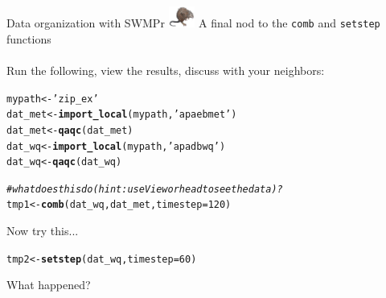 \documentclass[xcolor=dvipsnames,serif]{beamer}\usepackage[]{graphicx}\usepackage[]{color}
\makeatletter
\newcommand{\hlnum}[1]{\textcolor[rgb]{0.686,0.059,0.569}{#1}}%
\newcommand{\hlstr}[1]{\textcolor[rgb]{0.192,0.494,0.8}{#1}}%
\newcommand{\hlcom}[1]{\textcolor[rgb]{0.678,0.584,0.686}{\textit{#1}}}%
\newcommand{\hlstd}[1]{\textcolor[rgb]{0.345,0.345,0.345}{#1}}%
\newcommand{\hlkwb}[1]{\textcolor[rgb]{0.69,0.353,0.396}{#1}}%
\newcommand{\hlkwc}[1]{\textcolor[rgb]{0.333,0.667,0.333}{#1}}%
\newcommand{\hlkwd}[1]{\textcolor[rgb]{0.737,0.353,0.396}{\textbf{#1}}}%
\newenvironment{kframe}{%
 \def\at@end@of@kframe{}%
 \ifinner\ifhmode%
  \def\at@end@of@kframe{\end{minipage}}%
  \begin{minipage}{\columnwidth}%
 \fi\fi%
 \def\FrameCommand##1{\hskip\@totalleftmargin \hskip-\fboxsep
 \colorbox{shadecolor}{##1}\hskip-\fboxsep
     \hskip-\linewidth \hskip-\@totalleftmargin \hskip\columnwidth}%
 \MakeFramed {\advance\hsize-\width
   \@totalleftmargin\z@ \linewidth\hsize
   \@setminipage}}%
 {\par\unskip\endMakeFramed%
 \at@end@of@kframe}
\newenvironment{knitrout}{}{} %
\makeatother
\begin{document}
\begin{frame}[fragile]{Data organization with SWMPr \includegraphics[width = 0.065\textwidth]{imgs/swmprat.png}}
\onslide<+->
A final nod to the \texttt{comb} and \texttt{setstep} functions \\~\\
Run the following, view the results, discuss with your neighbors:
\begin{knitrout}\scriptsize
{}\color{fgcolor}\begin{kframe}
\begin{alltt}
\hlstd{mypath} \hlkwb{<-} \hlstr{'zip_ex'}
\hlstd{dat_met} \hlkwb{<-} \hlkwd{import_local}\hlstd{(mypath,} \hlstr{'apaebmet'}\hlstd{)}
\hlstd{dat_met} \hlkwb{<-} \hlkwd{qaqc}\hlstd{(dat_met)}
\hlstd{dat_wq} \hlkwb{<-} \hlkwd{import_local}\hlstd{(mypath,} \hlstr{'apadbwq'}\hlstd{)}
\hlstd{dat_wq} \hlkwb{<-} \hlkwd{qaqc}\hlstd{(dat_wq)}

\hlcom{# what does this do (hint: use View or head to see the data)?}
\hlstd{tmp1} \hlkwb{<-} \hlkwd{comb}\hlstd{(dat_wq, dat_met,} \hlkwc{timestep} \hlstd{=} \hlnum{120}\hlstd{)}
\end{alltt}
\end{kframe}
\end{knitrout}
\onslide<+->
Now try this...
\begin{knitrout}\scriptsize
{}\color{fgcolor}\begin{kframe}
\begin{alltt}
\hlstd{tmp2} \hlkwb{<-} \hlkwd{setstep}\hlstd{(dat_wq,} \hlkwc{timestep} \hlstd{=} \hlnum{60}\hlstd{)}
\end{alltt}
\end{kframe}
\end{knitrout}
What happened?
\end{frame}
\end{document}
